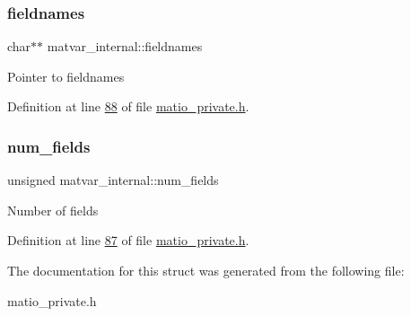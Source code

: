 \mbox{\label{structmatvar__internal_a7574d000bfc98ad4860ae6590b8d4985}} 
\subsubsection{\texorpdfstring{fieldnames}{fieldnames}}
{\footnotesize\ttfamily char$\ast$$\ast$ matvar\+\_\+internal\+::fieldnames}

Pointer to fieldnames 

Definition at line \hyperlink{matio__private_8h_source_l00088}{88} of file \hyperlink{matio__private_8h_source}{matio\+\_\+private.\+h}.

\mbox{\label{structmatvar__internal_a93fc447484f455eddf9334f2e9e411c2}} 
\subsubsection{\texorpdfstring{num\+\_\+fields}{num\_fields}}
{\footnotesize\ttfamily unsigned matvar\+\_\+internal\+::num\+\_\+fields}

Number of fields 

Definition at line \hyperlink{matio__private_8h_source_l00087}{87} of file \hyperlink{matio__private_8h_source}{matio\+\_\+private.\+h}.



The documentation for this struct was generated from the following file\+:\begin{DoxyCompactItemize}
\item 
matio\+\_\+private.\+h\end{DoxyCompactItemize}
